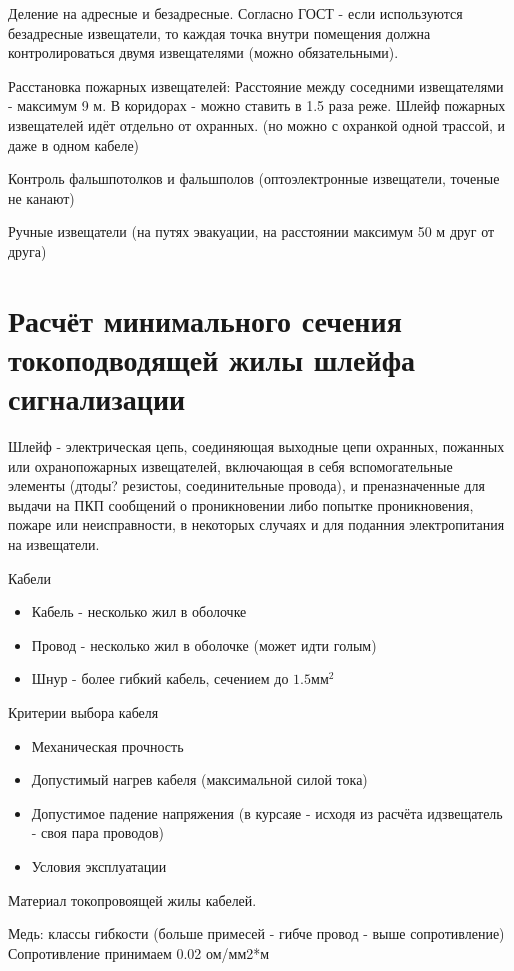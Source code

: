 \documentclass[a4paper,12pt]{report}
\begin{document}
	Деление на адресные и безадресные.
	Согласно ГОСТ - если используются безадресные извещатели, то каждая точка внутри помещения должна контролироваться двумя извещателями (можно обязательными).

	Расстановка пожарных извещателей:
	Расстояние между соседними извещателями - максимум 9 м. В коридорах - можно ставить в 1.5 раза реже.
	Шлейф пожарных извещателей идёт отдельно от охранных. (но можно с охранкой одной трассой, и даже в одном кабеле)

	Контроль фальшпотолков и фальшполов (оптоэлектронные извещатели, точеные не канают)


	Ручные извещатели (на путях эвакуации, на расстоянии максимум 50 м друг от друга)



	\section{Расчёт минимального сечения токоподводящей жилы шлейфа сигнализации}
	Шлейф - электрическая цепь, соединяющая выходные цепи охранных, пожанных или охранопожарных извещателей, включающая в себя вспомогательные элементы (дтоды? резистоы, соединительные провода), и преназначенные для выдачи на ПКП сообщений о проникновении либо попытке проникновения, пожаре или неисправности, в некоторых случаях и для поданния электропитания на извещатели.

	Кабели
	\begin{itemize}
	\item	Кабель - несколько жил в оболочке
	\item	Провод - несколько жил в оболочке (может идти голым)
	\item	Шнур - более гибкий кабель, сечением до $1.5 \mbox{мм}^2$
	\end{itemize}

	Критерии выбора кабеля
	\begin{itemize}
	\item	Механическая прочность
	\item	Допустимый нагрев кабеля (максимальной силой тока)
	\item	Допустимое падение напряжения (в курсаяе - исходя из расчёта идзвещатель - своя пара проводов)
	\item	Условия эксплуатации
	\end{itemize}

	Материал токопровоящей жилы кабелей.

	Медь: классы гибкости (больше примесей - гибче провод - выше сопротивление)
	Сопротивление принимаем 0.02 ом/мм2*м
\end{document}
